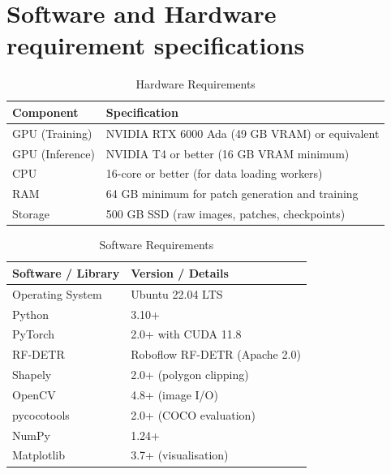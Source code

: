\section{Software and Hardware requirement specifications}

\begin{table}[H]
\centering
\caption{Hardware Requirements}
\begin{tabular}{ll}
\toprule
\rowcolor{tableHeader}\tableheadfont Component & \tableheadfont Specification \\
\midrule
GPU (Training)  & NVIDIA RTX 6000 Ada (49 GB VRAM) or equivalent \\
\rowcolor{tableRowAlt}GPU (Inference) & NVIDIA T4 or better (16 GB VRAM minimum) \\
CPU             & 16-core or better (for data loading workers) \\
\rowcolor{tableRowAlt}RAM             & 64 GB minimum for patch generation and training \\
Storage         & 500 GB SSD (raw images, patches, checkpoints) \\
\bottomrule
\end{tabular}
\end{table}

\begin{table}[H]
\centering
\caption{Software Requirements}
\begin{tabular}{ll}
\toprule
\rowcolor{tableHeader}\tableheadfont Software / Library & \tableheadfont Version / Details \\
\midrule
Operating System  & Ubuntu 22.04 LTS \\
\rowcolor{tableRowAlt}Python            & 3.10+ \\
PyTorch           & 2.0+ with CUDA 11.8 \\
\rowcolor{tableRowAlt}RF-DETR           & Roboflow RF-DETR (Apache 2.0) \\
Shapely           & 2.0+ (polygon clipping) \\
\rowcolor{tableRowAlt}OpenCV            & 4.8+ (image I/O) \\
pycocotools       & 2.0+ (COCO evaluation) \\
\rowcolor{tableRowAlt}NumPy             & 1.24+ \\
Matplotlib        & 3.7+ (visualisation) \\
\bottomrule
\end{tabular}
\end{table}
